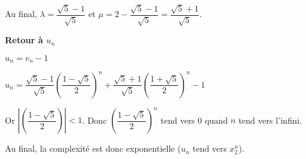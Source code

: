 \documentclass[10pt,fleqn]{article} %
\begin{document}
\begin{multicols}{2}
\begin{itemize}
Au final, $ \lambda=\dfrac{\sqrt{5}-1}{\sqrt{5}} $ et  $\mu=2-\dfrac{\sqrt{5}-1}{\sqrt{5}}=\dfrac{\sqrt{5}+1}{\sqrt{5}}$.





\textbf{Retour à $u_n$}

$u_n = v_n-1$ 

$ u_n = \dfrac{\sqrt{5}-1}{\sqrt{5}} \left(\dfrac{1-\sqrt{5}}{2}\right)^n+\dfrac{\sqrt{5}+1}{\sqrt{5}} \left(\dfrac{1+\sqrt{5}}{2}\right)^n -1$


Or $\left|  \left(\dfrac{1-\sqrt{5}}{2}\right) \right| <1$. Donc $\left(\dfrac{1-\sqrt{5}}{2}\right)^n$ tend vers 0 quand $n$ tend vers l'infini.

Au final, la complexité est donc exponentielle ($u_n$ tend vers $x_2^n$).
\end{itemize}


\ifprof
\else
\end{multicols}
\fi
\end{document}

